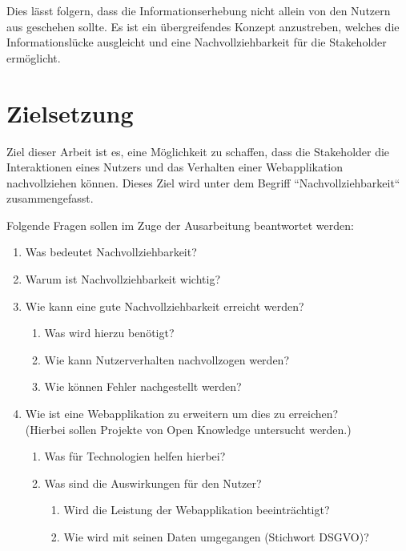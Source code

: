 Dies lässt folgern, dass die Informationserhebung nicht allein von den Nutzern aus geschehen sollte. Es ist ein übergreifendes Konzept anzustreben, welches die Informationslücke ausgleicht und eine Nachvollziehbarkeit für die Stakeholder ermöglicht.

\section{Zielsetzung}


Ziel dieser Arbeit ist es, eine Möglichkeit zu schaffen, dass die Stakeholder die Interaktionen eines Nutzers und das Verhalten einer Webapplikation nachvollziehen können. Dieses Ziel wird unter dem Begriff ``Nachvollziehbarkeit`` zusammengefasst.

Folgende Fragen sollen im Zuge der Ausarbeitung beantwortet werden:


\begin{enumerate}
	\item Was bedeutet Nachvollziehbarkeit?
	\item Warum ist Nachvollziehbarkeit wichtig?
	\item Wie kann eine gute Nachvollziehbarkeit erreicht werden?
	\begin{enumerate}
		\item Was wird hierzu benötigt?
		\item Wie kann Nutzerverhalten nachvollzogen werden?
		\item Wie können Fehler nachgestellt werden?
	\end{enumerate}
	\item Wie ist eine Webapplikation zu erweitern um dies zu erreichen? \\ (Hierbei sollen Projekte von Open Knowledge untersucht werden.)
	\begin{enumerate}
		\item Was für Technologien helfen hierbei?
		\item Was sind die Auswirkungen für den Nutzer?
		\begin{enumerate}
			\item Wird die Leistung der Webapplikation beeinträchtigt?
			\item Wie wird mit seinen Daten umgegangen (Stichwort DSGVO)?
		\end{enumerate}
	\end{enumerate}
\end{enumerate}



